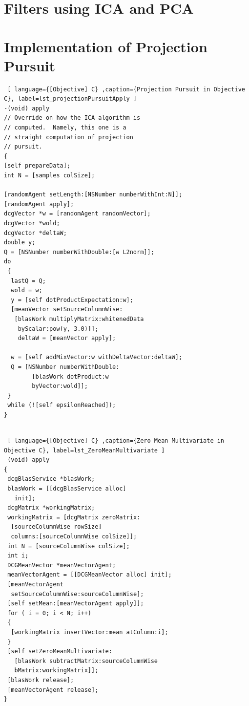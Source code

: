 \documentclass[12pt ]{article}
\begin{document}
\section{Filters using ICA and PCA}\label{transformation-masking-maps}

\appendix
\section{Implementation of Projection Pursuit}

\begin{lstlisting} [ language={[Objective] C} ,caption={Projection Pursuit in Objective C}, label=lst_projectionPursuitApply ] 
-(void) apply
// Override on how the ICA algorithm is 
// computed.  Namely, this one is a 
// straight computation of projection 
// pursuit. 
{
[self prepareData];
int N = [samples colSize];
	
[randomAgent setLength:[NSNumber numberWithInt:N]];
[randomAgent apply];
dcgVector *w = [randomAgent randomVector];
dcgVector *wold;
dcgVector *deltaW;
double y;
Q = [NSNumber numberWithDouble:[w L2norm]];
do 
 {
  lastQ = Q;
  wold = w;
  y = [self dotProductExpectation:w];
  [meanVector setSourceColumnWise:
   [blasWork multiplyMatrix:whitenedData 
 	byScalar:pow(y, 3.0)]];
 	deltaW = [meanVector apply];

  w = [self addMixVector:w withDeltaVector:deltaW];
  Q = [NSNumber numberWithDouble:
		[blasWork dotProduct:w 
		byVector:wold]];
 }
 while (![self epsilonReached]);
}


\end{lstlisting}


\begin{lstlisting} [ language={[Objective] C} ,caption={Zero Mean Multivariate in Objective C}, label=lst_ZeroMeanMultivariate ] 
-(void) apply
{
 dcgBlasService *blasWork; 
 blasWork = [[dcgBlasService alloc] 
   init];
 dcgMatrix *workingMatrix;
 workingMatrix = [dcgMatrix zeroMatrix:
  [sourceColumnWise rowSize] 
  columns:[sourceColumnWise colSize]];
 int N = [sourceColumnWise colSize];
 int i;
 DCGMeanVector *meanVectorAgent;
 meanVectorAgent = [[DCGMeanVector alloc] init];
 [meanVectorAgent 
  setSourceColumnWise:sourceColumnWise];
 [self setMean:[meanVectorAgent apply]];
 for ( i = 0; i < N; i++)
 {
  [workingMatrix insertVector:mean atColumn:i];
 }
 [self setZeroMeanMultivariate:
   [blasWork subtractMatrix:sourceColumnWise 
   bMatrix:workingMatrix]];
 [blasWork release];
 [meanVectorAgent release];
}
\end{lstlisting}
\end{document}
